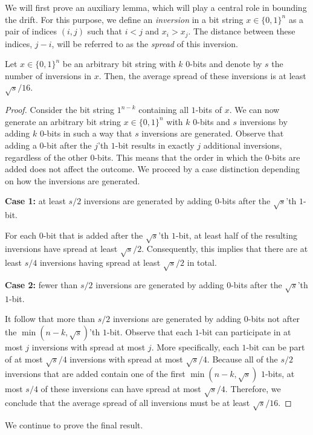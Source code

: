 We will first prove an auxiliary lemma, which will play a central role in bounding the drift. For this purpose, we define an \emph{inversion} in a bit string $x\in \{0,1\}^n$ as a pair of indices $(i,j)$ such that $i<j$ and $x_i > x_j$. The distance between these indices, $j-i$, will be referred to as the \emph{spread} of this inversion.
\vspace{3mm}
\begin{lemma}
\label{lem:avgSpread}
    Let $x \in \{0,1\}^n$ be an arbitrary bit string with $k$ $0$-bits and denote by $s$ the number of inversions in $x$. Then, the average spread of these inversions is at least $\sqrt{s}/16$.
\end{lemma}
\begin{proof}
    Consider the bit string $1^{n-k}$ containing all $1$-bits of $x$. We can now generate an arbitrary bit string $x \in \{0,1\}^n$ with $k$ $0$-bits and $s$ inversions by adding $k$ $0$-bits in such a way that $s$ inversions are generated. Observe that adding a $0$-bit after the $j$'th $1$-bit results in exactly $j$ additional inversions, regardless of the other $0$-bits. This means that the order in which the $0$-bits are added does not affect the outcome. We proceed by a case distinction depending on how the inversions are generated.
    
    \vspace{2mm}
    \textbf{Case 1:} at least $s/2$ inversions are generated by adding $0$-bits after the $ \sqrt{s} $'th $1$-bit. 
    
    For each $0$-bit that is added after the $ \sqrt{s} $'th $1$-bit, at least half of the resulting inversions have spread at least $\sqrt{s}/2$. Consequently, this implies that there are at least $s/4$ inversions having spread at least $\sqrt{s}/2$ in total. 

    \vspace{2mm}
    \textbf{Case 2:} fewer than $s/2$ inversions are generated by adding $0$-bits after the $ \sqrt{s} $'th $1$-bit. 
    
    It follow that more than $s/2$ inversions are generated by adding $0$-bits not after the $\min(n-k,  \sqrt{s} )$'th $1$-bit. Observe that each $1$-bit can participate in at most $j$ inversions with spread at most $j$. More specifically, each $1$-bit can be part of at most $\sqrt{s}/4$ inversions with spread at most $\sqrt{s}/4$. Because all of the $s/2$ inversions that are added contain one of the first $\min(n-k,\sqrt{s})$ $1$-bits, at most $s/4$ of these inversions can have spread at most $\sqrt{s}/4$. Therefore, we conclude that the average spread of all inversions must be at least $\sqrt{s}/16$. 
\end{proof}
\vspace{3mm}
We continue to prove the final result. 

